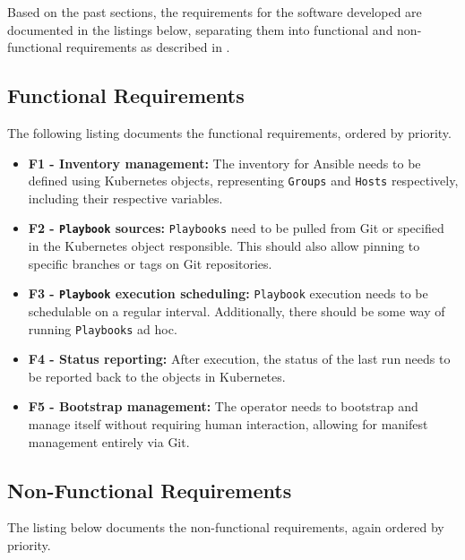 Based on the past sections, the requirements for the software developed are documented in the listings below, separating them into functional and non-functional requirements as described in \cite{braunNichtfunktionaleAnforderungen2016}.

\subsection{Functional Requirements}
The following listing documents the functional requirements, ordered by priority.

\begin{itemize}
	\item \textbf{F1 - Inventory management:}
	      The inventory for Ansible needs to be defined using Kubernetes objects, representing \texttt{Groups} and \texttt{Hosts} respectively, including their respective variables.
	\item \textbf{F2 - \texttt{Playbook} sources:}
	      \texttt{Playbooks} need to be pulled from Git or specified in the Kubernetes object responsible. This should also allow pinning to specific branches or tags on Git repositories.
	\item \textbf{F3 - \texttt{Playbook} execution scheduling:}
	      \texttt{Playbook} execution needs to be schedulable on a regular interval. Additionally, there should be some way of running \texttt{Playbooks} ad hoc.
	\item \textbf{F4 - Status reporting:}
	      After execution, the status of the last run needs to be reported back to the objects in Kubernetes.
	\item \textbf{F5 - Bootstrap management:}
	      The operator needs to bootstrap and manage itself without requiring human interaction, allowing for manifest management entirely via Git.
\end{itemize}

\subsection{Non-Functional Requirements}
The listing below documents the non-functional requirements, again ordered by priority.

